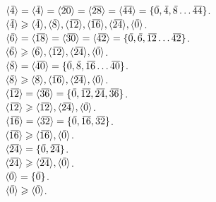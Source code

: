 \documentclass[12pt]{article}
\begin{document}
    $\langle \olsi{4} \rangle
    = \langle \olsi{4} \rangle = \langle \olsi{20} \rangle
    = \langle \olsi{28} \rangle = \langle \olsi{44} \rangle
    = \{\olsi{0}, \olsi{4}, \olsi{8} \dots \olsi{44}\}$. \\
    $\langle \,\overline{\!{4}} \rangle \geqslant
    \langle \,\overline{\!{4}} \rangle,
    \langle \,\overline{\!{8}} \rangle,
    \langle \,\overline{\!{12}} \rangle,
    \langle \,\overline{\!{16}} \rangle,
    \langle \,\overline{\!{24}} \rangle,
    \langle \,\overline{\!{0}} \rangle$. \\
    $\langle \olsi{6} \rangle
    = \langle \olsi{18} \rangle = \langle \olsi{30} \rangle
    = \langle \olsi{42} \rangle
    = \{\olsi{0}, \olsi{6}, \olsi{12} \dots \olsi{42}\}$. \\
    $\langle \,\overline{\!{6}} \rangle \geqslant
    \langle \,\overline{\!{6}} \rangle,
    \langle \,\overline{\!{12}} \rangle,
    \langle \,\overline{\!{24}} \rangle,
    \langle \,\overline{\!{0}} \rangle$. \\
    $\langle \,\overline{\!{8}} \rangle
    = \langle \,\overline{\!{40}} \rangle
    = \{\,\overline{\!{0}}, \,\overline{\!{8}}, \,\overline{\!{16}} \dots \,\overline{\!{40}}\}$. \\
    $\langle \,\overline{\!{8}} \rangle \geqslant
    \langle \,\overline{\!{8}} \rangle,
    \langle \,\overline{\!{16}} \rangle,
    \langle \,\overline{\!{24}} \rangle,
    \langle \,\overline{\!{0}} \rangle$. \\
    $\langle \,\overline{\!{12}} \rangle
    = \langle \,\overline{\!{36}} \rangle
    = \{\,\overline{\!{0}}, \,\overline{\!{12}}, \,\overline{\!{24}}, \,\overline{\!{36}}\}$. \\
    $\langle \,\overline{\!{12}} \rangle \geqslant
    \langle \,\overline{\!{12}} \rangle,
    \langle \,\overline{\!{24}} \rangle,
    \langle \,\overline{\!{0}} \rangle$. \\
    $\langle \,\overline{\!{16}} \rangle
    = \langle \,\overline{\!{32}} \rangle
    = \{\,\overline{\!{0}}, \,\overline{\!{16}}, \,\overline{\!{32}}\}$. \\
    $\langle \,\overline{\!{16}} \rangle \geqslant
    \langle \,\overline{\!{16}} \rangle,
    \langle \,\overline{\!{0}} \rangle$. \\
    $\langle \,\overline{\!{24}} \rangle
    = \{\,\overline{\!{0}}, \,\overline{\!{24}}\}$. \\
    $\langle \,\overline{\!{24}} \rangle \geqslant
    \langle \,\overline{\!{24}} \rangle,
    \langle \,\overline{\!{0}} \rangle$. \\
    $\langle \,\overline{\!{0}} \rangle
    = \{\,\overline{\!{0}}\}$. \\
    $\langle \,\overline{\!{0}} \rangle \geqslant
    \langle \,\overline{\!{0}} \rangle$. \\
    
\end{document}
